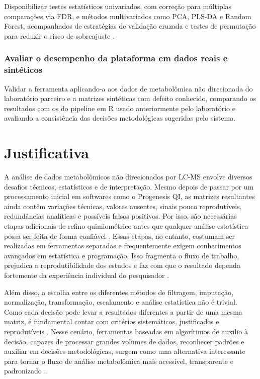 Disponibilizar testes estatísticos univariados, com correção para múltiplas comparações via FDR, e métodos multivariados como PCA, PLS-DA e Random Forest, acompanhados de estratégias de validação cruzada e testes de permutação para reduzir o risco de sobreajuste \cite{worley2013multivariate}.

\subsubsection{Avaliar o desempenho da plataforma em dados reais e sintéticos}
 
Validar a ferramenta aplicando-a aos dados de metabolômica não direcionada do laboratório parceiro e a matrizes sintéticas com defeito conhecido, comparando os resultados com os do pipeline em R usado anteriormente pelo laboratório e avaliando a consistência das decisões metodológicas sugeridas pelo sistema.

\section{Justificativa}
 
A análise de dados metabolômicos não direcionados por LC-MS envolve diversos desafios técnicos, estatísticos e de interpretação. Mesmo depois de passar por um processamento inicial em softwares como o Progenesis QI, as matrizes resultantes ainda contêm variações técnicas, valores ausentes, sinais pouco reprodutíveis, redundâncias analíticas e possíveis falsos positivos. Por isso, são necessárias etapas adicionais de refino quimiométrico antes que qualquer análise estatística possa ser feita de forma confiável \cite{mahieu2017systems}. Essas etapas, no entanto, costumam ser realizadas em ferramentas separadas e frequentemente exigem conhecimentos avançados em estatística e programação. Isso fragmenta o fluxo de trabalho, prejudica a reprodutibilidade dos estudos e faz com que o resultado dependa fortemente da experiência individual do pesquisador \cite{weber2017computational}.
 
Além disso, a escolha entre os diferentes métodos de filtragem, imputação, normalização, transformação, escalamento e análise estatística não é trivial. Como cada decisão pode levar a resultados diferentes a partir de uma mesma matriz, é fundamental contar com critérios sistemáticos, justificados e reprodutíveis \cite{diguida2016non}. Nesse cenário, ferramentas baseadas em algorítimos de auxilio à decisão, capazes de processar grandes volumes de dados, reconhecer padrões e auxiliar em decisões metodológicas, surgem como uma alternativa interessante para tornar o fluxo de análise metabolômica mais acessível, transparente e padronizado \cite{sen2021deep}.
 
